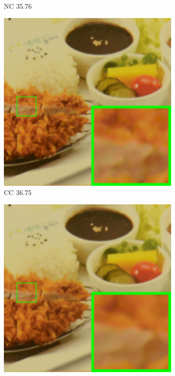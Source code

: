\begin{figure}
\begin{subfigure}[t]{0.19\textwidth}
		\caption{NC 35.76}
    \end{subfigure}
    \hfill
    \begin{subfigure}[t]{0.19\textwidth}
        \centering
        \includegraphics[width=1\textwidth]{images/mcwnnm/cc/resize_br_CC_d800_iso3200_2.png}
		\caption{CC 36.75}
    \end{subfigure}
    \hfill
    \begin{subfigure}[t]{0.19\textwidth}
        \centering
        \includegraphics[width=1\textwidth]{images/mcwnnm/cc/resize_br_WNNMJ_CC15_d800_iso3200_2.png}

\end{subfigure}
\end{figure}
